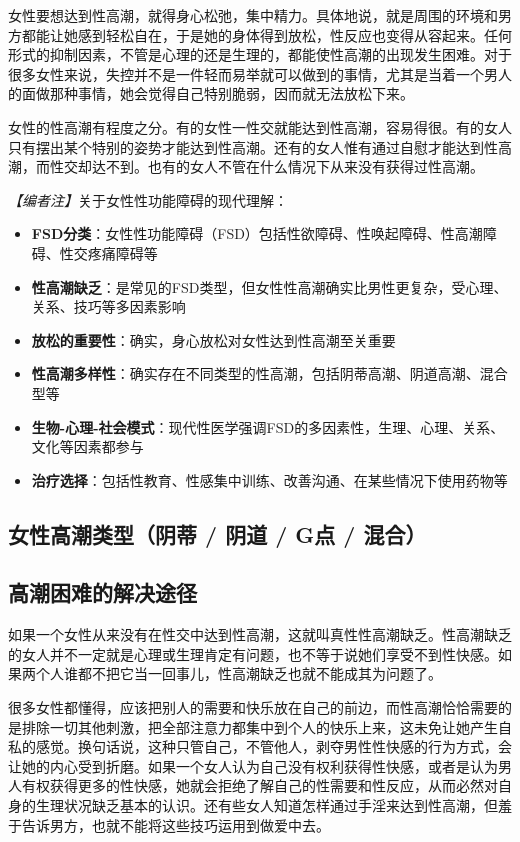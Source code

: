 \begin{enumerate}
女性要想达到性高潮，就得身心松弛，集中精力。具体地说，就是周围的环境和男方都能让她感到轻松自在，于是她的身体得到放松，性反应也变得从容起来。任何形式的抑制因素，不管是心理的还是生理的，都能使性高潮的出现发生困难。对于很多女性来说，失控并不是一件轻而易举就可以做到的事情，尤其是当着一个男人的面做那种事情，她会觉得自己特别脆弱，因而就无法放松下来。

女性的性高潮有程度之分。有的女性一性交就能达到性高潮，容易得很。有的女人只有摆出某个特别的姿势才能达到性高潮。还有的女人惟有通过自慰才能达到性高潮，而性交却达不到。也有的女人不管在什么情况下从来没有获得过性高潮。

\noindent\textit{【编者注】}关于女性性功能障碍的现代理解：
\begin{itemize}
	\item \textbf{FSD分类}：女性性功能障碍（FSD）包括性欲障碍、性唤起障碍、性高潮障碍、性交疼痛障碍等
	\item \textbf{性高潮缺乏}：是常见的FSD类型，但女性性高潮确实比男性更复杂，受心理、关系、技巧等多因素影响
	\item \textbf{放松的重要性}：确实，身心放松对女性达到性高潮至关重要
	\item \textbf{性高潮多样性}：确实存在不同类型的性高潮，包括阴蒂高潮、阴道高潮、混合型等
	\item \textbf{生物-心理-社会模式}：现代性医学强调FSD的多因素性，生理、心理、关系、文化等因素都参与
	\item \textbf{治疗选择}：包括性教育、性感集中训练、改善沟通、在某些情况下使用药物等
\end{itemize}

\subsection{女性高潮类型（阴蒂 / 阴道 / G点 / 混合）}
\subsection{高潮困难的解决途径}

如果一个女性从来没有在性交中达到性高潮，这就叫真性性高潮缺乏。性高潮缺乏的女人并不一定就是心理或生理肯定有问题，也不等于说她们享受不到性快感。如果两个人谁都不把它当一回事儿，性高潮缺乏也就不能成其为问题了。

很多女性都懂得，应该把别人的需要和快乐放在自己的前边，而性高潮恰恰需要的是排除一切其他刺激，把全部注意力都集中到个人的快乐上来，这未免让她产生自私的感觉。换句话说，这种只管自己，不管他人，剥夺男性性快感的行为方式，会让她的内心受到折磨。如果一个女人认为自己没有权利获得性快感，或者是认为男人有权获得更多的性快感，她就会拒绝了解自己的性需要和性反应，从而必然对自身的生理状况缺乏基本的认识。还有些女人知道怎样通过手淫来达到性高潮，但羞于告诉男方，也就不能将这些技巧运用到做爱中去。


\end{enumerate}
